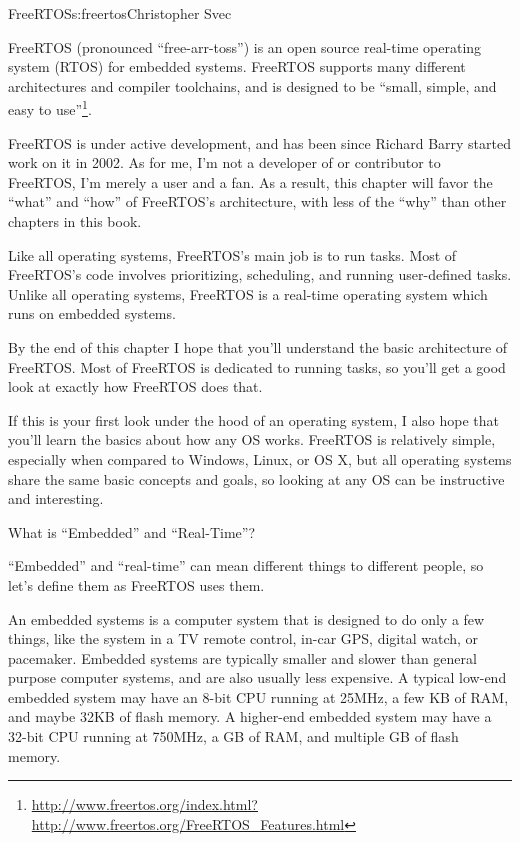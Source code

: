 \begin{aosachapter}{FreeRTOS}{s:freertos}{Christopher Svec}

FreeRTOS (pronounced ``free-arr-toss'') is an open source real-time
operating system (RTOS) for embedded systems. FreeRTOS supports many
different architectures and compiler toolchains, and is designed to be
``small, simple, and easy to
use''\footnote{\url{http://www.freertos.org/index.html?http://www.freertos.org/FreeRTOS_Features.html}}.

FreeRTOS is under active development, and has been since Richard Barry
started work on it in 2002.  As for me, I'm not a developer of or
contributor to FreeRTOS, I'm merely a user and a fan. As a result,
this chapter will favor the ``what'' and ``how'' of FreeRTOS's
architecture, with less of the ``why'' than other chapters in this
book.

Like all operating systems, FreeRTOS's main job is to run tasks. Most
of FreeRTOS's code involves prioritizing, scheduling, and running
user-defined tasks.  Unlike all operating systems, FreeRTOS is a
real-time operating system which runs on embedded systems.

By the end of this chapter I hope that you'll understand the basic
architecture of FreeRTOS. Most of FreeRTOS is dedicated to running
tasks, so you'll get a good look at exactly how FreeRTOS does that.

If this is your first look under the hood of an operating system, I
also hope that you'll learn the basics about how any OS
works. FreeRTOS is relatively simple, especially when compared to
Windows, Linux, or OS X, but all operating systems share the same basic
concepts and goals, so looking at any OS can be instructive
and interesting.

\begin{aosasect1}{What is ``Embedded'' and ``Real-Time''?}

``Embedded'' and ``real-time'' can mean different things to different
people, so let's define them as FreeRTOS uses them.

An embedded systems is a computer system that is designed to do only a
few things, like the system in a TV remote control, in-car GPS, digital
watch, or pacemaker.  Embedded systems are typically smaller and
slower than general purpose computer systems, and are also usually
less expensive. A typical low-end embedded system may have an 8-bit
CPU running at 25MHz, a few KB of RAM, and maybe 32KB of flash memory.
A higher-end embedded system may have a 32-bit CPU running at 750MHz,
a GB of RAM, and multiple GB of flash memory.


\end{aosasect1}
\end{aosachapter}
